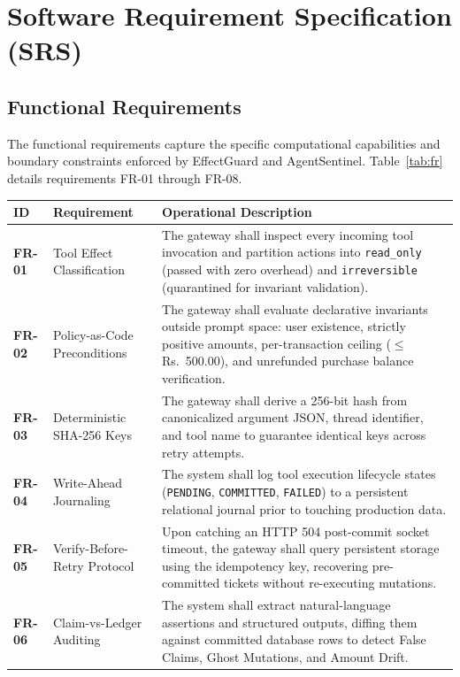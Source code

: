 \section{Software Requirement Specification (SRS)}

\subsection{Functional Requirements}

The functional requirements capture the specific computational capabilities and boundary constraints enforced by EffectGuard and AgentSentinel. Table~\ref{tab:fr} details requirements FR-01 through FR-08.

\begin{table}[H]
\centering
\small
\renewcommand{\arraystretch}{1.25}
\begin{tabular}{|p{1.4cm}|p{3.4cm}|p{8.5cm}|}
\hline
\rowcolor{gray!15}
\textbf{ID} & \textbf{Requirement} & \textbf{Operational Description} \\
\hline
\textbf{FR-01} & Tool Effect Classification & The gateway shall inspect every incoming tool invocation and partition actions into \texttt{read\_only} (passed with zero overhead) and \texttt{irreversible} (quarantined for invariant validation). \\
\hline
\textbf{FR-02} & Policy-as-Code Preconditions & The gateway shall evaluate declarative invariants outside prompt space: user existence, strictly positive amounts, per-transaction ceiling ($\le$ Rs.~500.00), and unrefunded purchase balance verification. \\
\hline
\textbf{FR-03} & Deterministic SHA-256 Keys & The gateway shall derive a 256-bit hash from canonicalized argument JSON, thread identifier, and tool name to guarantee identical keys across retry attempts. \\
\hline
\textbf{FR-04} & Write-Ahead Journaling & The system shall log tool execution lifecycle states (\texttt{PENDING}, \texttt{COMMITTED}, \texttt{FAILED}) to a persistent relational journal prior to touching production data. \\
\hline
\textbf{FR-05} & Verify-Before-Retry Protocol & Upon catching an HTTP 504 post-commit socket timeout, the gateway shall query persistent storage using the idempotency key, recovering pre-committed tickets without re-executing mutations. \\
\hline
\textbf{FR-06} & Claim-vs-Ledger Auditing & The system shall extract natural-language assertions and structured outputs, diffing them against committed database rows to detect False Claims, Ghost Mutations, and Amount Drift. \\

\end{tabular}
\end{table}
